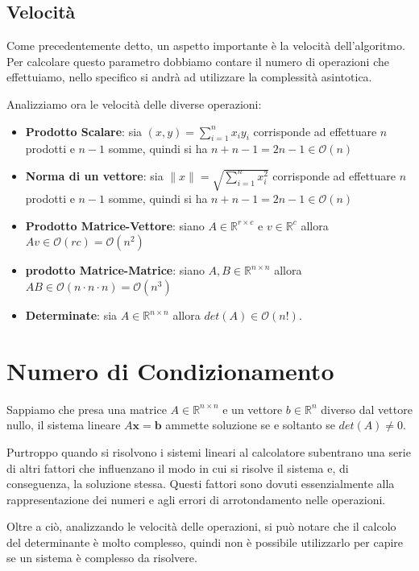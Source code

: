 \subsection{Velocità}
Come precedentemente detto, un aspetto importante è la velocità dell'algoritmo.
Per calcolare questo parametro dobbiamo contare il numero di operazioni che
effettuiamo, nello specifico si andrà ad utilizzare la complessità asintotica.

Analizziamo ora le velocità delle diverse operazioni:
\begin{itemize}
    \item \textbf{Prodotto Scalare}: sia $(x,y) = \sum_{i=1}^n x_iy_i$ corrisponde
          ad effettuare $n$ prodotti e $n-1$ somme, quindi si ha $n + n - 1 = 2
              n -1 \in \mathcal{O}(n)$
    \item \textbf{Norma di un vettore}: sia $\|x\| = \sqrt{\sum_{i=1}^n x_i^2}$
          corrisponde ad effettuare $n$ prodotti e $n-1$ somme, quindi si ha
          $n + n - 1 = 2n -1 \in \mathcal{O}(n)$
    \item \textbf{Prodotto Matrice-Vettore}: siano $A\in \mathbb{R}^{r\times c}$
          e $v\in \mathbb{R}^c$ allora $Av\in \mathcal{O} (rc) = \mathcal{O}(n^2)$
    \item \textbf{prodotto Matrice-Matrice}: siano $A,B\in \mathbb{R}^{n\times n}$
          allora $AB\in \mathcal{O} (n \cdot n \cdot n) = \mathcal{O} (n^3)$
    \item \textbf{Determinate}: sia $A\in \mathbb{R}^{n\times n}$ allora
          $det(A) \in \mathcal{O}(n!)$.
\end{itemize}
\section{Numero di Condizionamento}
Sappiamo che presa una matrice $A \in \mathbb{R}^{n \times n}$ e un vettore $b
    \in \mathbb{R}^n$ diverso dal vettore nullo, il sistema lineare $A \textbf{x} =
    \textbf{b}$ ammette soluzione se e soltanto se $det(A) \neq 0$.

Purtroppo quando si risolvono i sistemi lineari al calcolatore subentrano una
serie di altri fattori che influenzano il modo in cui si risolve il sistema e,
di conseguenza, la soluzione stessa. Questi fattori sono dovuti essenzialmente
alla rappresentazione dei numeri e agli errori di arrotondamento nelle operazioni.

Oltre a ciò, analizzando le velocità delle operazioni, si può notare che il
calcolo del determinante è molto complesso, quindi non è possibile utilizzarlo
per capire se un sistema è complesso da risolvere.

